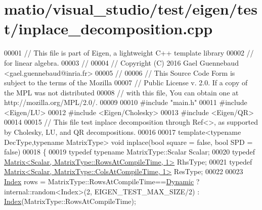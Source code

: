 \hypertarget{matio_2visual__studio_2test_2eigen_2test_2inplace__decomposition_8cpp_source}{}\section{matio/visual\+\_\+studio/test/eigen/test/inplace\+\_\+decomposition.cpp}
\label{matio_2visual__studio_2test_2eigen_2test_2inplace__decomposition_8cpp_source}

\begin{DoxyCode}
00001 \textcolor{comment}{// This file is part of Eigen, a lightweight C++ template library}
00002 \textcolor{comment}{// for linear algebra.}
00003 \textcolor{comment}{//}
00004 \textcolor{comment}{// Copyright (C) 2016 Gael Guennebaud <gael.guennebaud@inria.fr>}
00005 \textcolor{comment}{//}
00006 \textcolor{comment}{// This Source Code Form is subject to the terms of the Mozilla}
00007 \textcolor{comment}{// Public License v. 2.0. If a copy of the MPL was not distributed}
00008 \textcolor{comment}{// with this file, You can obtain one at http://mozilla.org/MPL/2.0/.}
00009 
00010 \textcolor{preprocessor}{#include "main.h"}
00011 \textcolor{preprocessor}{#include <Eigen/LU>}
00012 \textcolor{preprocessor}{#include <Eigen/Cholesky>}
00013 \textcolor{preprocessor}{#include <Eigen/QR>}
00014 
00015 \textcolor{comment}{// This file test inplace decomposition through Ref<>, as supported by Cholesky, LU, and QR decompositions.}
00016 
00017 \textcolor{keyword}{template}<\textcolor{keyword}{typename} DecType,\textcolor{keyword}{typename} MatrixType> \textcolor{keywordtype}{void} inplace(\textcolor{keywordtype}{bool} square = \textcolor{keyword}{false}, \textcolor{keywordtype}{bool} SPD = \textcolor{keyword}{false})
00018 \{
00019   \textcolor{keyword}{typedef} \textcolor{keyword}{typename} MatrixType::Scalar Scalar;
00020   \textcolor{keyword}{typedef} \hyperlink{group___core___module_class_eigen_1_1_matrix}{Matrix<Scalar, MatrixType::RowsAtCompileTime, 1>} 
      RhsType;
00021   \textcolor{keyword}{typedef} \hyperlink{group___core___module_class_eigen_1_1_matrix}{Matrix<Scalar, MatrixType::ColsAtCompileTime, 1>} 
      ResType;
00022 
00023   \hyperlink{namespace_eigen_a62e77e0933482dafde8fe197d9a2cfde}{Index} rows = MatrixType::RowsAtCompileTime==\hyperlink{namespace_eigen_ad81fa7195215a0ce30017dfac309f0b2}{Dynamic} ? internal::random<Index>(2,
      EIGEN\_TEST\_MAX\_SIZE/2) : \hyperlink{namespace_eigen_a62e77e0933482dafde8fe197d9a2cfde}{Index}(MatrixType::RowsAtCompileTime);

\end{DoxyCode}
